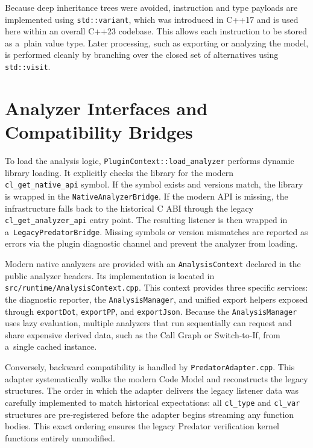 \documentclass[xpsejal00-gcc-plugin.tex]{subfiles}
\begin{document}
Because deep inheritance trees were avoided, instruction and type payloads are implemented using \texttt{std::variant}, which was introduced in C++17 and is used here within an overall C++23 codebase.
This allows each instruction to be stored as a~plain value type.
Later processing, such as exporting or analyzing the model, is performed cleanly by branching over the closed set of alternatives using \texttt{std::visit}.

\section{Analyzer Interfaces and Compatibility Bridges}\label{sec:analyzer-interfaces}

To load the analysis logic, \texttt{PluginContext::load\_analyzer} performs dynamic library loading.
It explicitly checks the library for the modern \texttt{cl\_get\_native\_api} symbol.
If the symbol exists and versions match, the library is wrapped in the \texttt{NativeAnalyzerBridge}.
If the modern API is missing, the infrastructure falls back to the historical C ABI through the legacy \texttt{cl\_get\_analyzer\_api} entry point.
The resulting listener is then wrapped in a~\texttt{LegacyPredatorBridge}.
Missing symbols or version mismatches are reported as errors via the plugin diagnostic channel and prevent the analyzer from loading.

Modern native analyzers are provided with an \texttt{AnalysisContext} declared in the public analyzer headers.
Its implementation is located in \texttt{src/runtime/AnalysisContext.cpp}.
This context provides three specific services: the diagnostic reporter, the \texttt{AnalysisManager}, and unified export helpers exposed through \texttt{exportDot}, \texttt{exportPP}, and \texttt{exportJson}.
Because the \texttt{AnalysisManager} uses lazy evaluation, multiple analyzers that run sequentially can request and share expensive derived data, such as the Call Graph or Switch-to-If, from a~single cached instance.

Conversely, backward compatibility is handled by \texttt{PredatorAdapter.cpp}.
This adapter systematically walks the modern Code Model and reconstructs the legacy structures.
The order in which the adapter delivers the legacy listener data was carefully implemented to match historical expectations: all \texttt{cl\_type} and \texttt{cl\_var} structures are pre-registered before the adapter begins streaming any function bodies.
This exact ordering ensures the legacy Predator verification kernel functions entirely unmodified.
\end{document}
